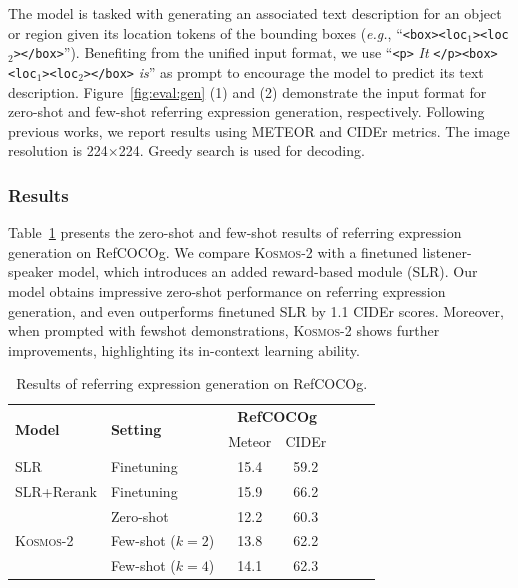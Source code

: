 \documentclass{article}
\newcommand\our{\textsc{Kosmos-2}}
\newcommand\eg{\textit{e.g.}}
\begin{document}
The model is tasked with generating an associated text description for an object or region given its location tokens of the bounding boxes (\eg, ``\texttt{<box>}\texttt{<loc$_1$>}\texttt{<loc$_2$>}\texttt{</box>}'').
Benefiting from the unified input format, we use ``\texttt{<p>} \textit{It} \texttt{</p>}\texttt{<box>}\texttt{<loc$_1$>}\texttt{<loc$_2$>}\texttt{</box>} \textit{is}'' as prompt to encourage the model to predict its text description.
Figure~\ref{fig:eval:gen} (1) and (2) demonstrate the input format for zero-shot and few-shot referring expression generation, respectively.
Following previous works, we report results using METEOR and CIDEr metrics.
The image resolution is 224$\times$224. Greedy search is used for decoding.

\subsubsection{Results}

Table~\ref{tbl:expgen:refcocog} presents the zero-shot and few-shot results of referring expression generation on RefCOCOg.
We compare \our{} with a finetuned listener-speaker model, which introduces an added reward-based module (SLR).
Our model obtains impressive zero-shot performance on referring expression generation, and even outperforms finetuned SLR by 1.1 CIDEr scores.
Moreover, when prompted with fewshot demonstrations, \our{} shows further improvements, highlighting its in-context learning ability.


\begin{table}[ht]
\centering
\begin{tabular}{llccccc}
\toprule
\multirow{2}{*}{\textbf{Model}} & \multirow{2}{*}{\textbf{Setting}} & \multicolumn{2}{c}{\textbf{RefCOCOg}} \\
 &  & Meteor & CIDEr \\ \midrule
SLR\cite{slr2017} & Finetuning & 15.4 & 59.2 \\
SLR+Rerank\cite{slr2017} & Finetuning & 15.9 & 66.2 \\
\midrule
\multirow{3}{*}{\our{}} & Zero-shot & 12.2 & 60.3 \\
& Few-shot ($k=2$) & 13.8 & 62.2 \\
& Few-shot ($k=4$) & 14.1 & 62.3 \\
\bottomrule
\end{tabular}
\vspace{0.2cm}
\caption{Results of referring expression generation on RefCOCOg.
}
\label{tbl:expgen:refcocog}
\end{table}
\end{document}

